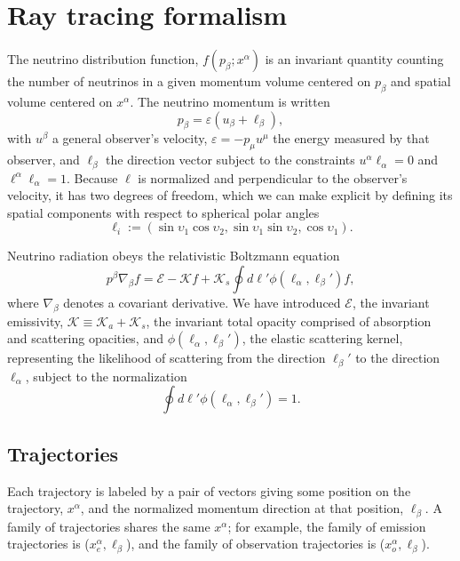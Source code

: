 \documentclass[aps,prd,twocolumn,superscriptaddress,groupedaddress]{revtex4}
\newcommand{\todo}[1]{\marginpar{\tiny{\textcolor{red}{#1}}}}
\begin{document}
\section{Ray tracing formalism}

The neutrino distribution function, $f(p_\beta; x^\alpha)$ is an invariant
quantity counting the number of neutrinos in a given momentum volume centered on
$p_\beta$ and spatial volume centered on $x^\alpha$.
The neutrino momentum is written
\begin{equation}
  \label{eqn:def_momentum}
  p_\beta = \varepsilon (u_\beta + \ell_\beta),
\end{equation}
with $u^\beta$ a general observer's velocity,
$\varepsilon=-p_\mu u^\mu$ the energy measured by that observer,
and $\ell_\beta$ the direction vector subject to the constraints
$u^\alpha \ell_\alpha = 0$ and
$\ell^\alpha \ell_\alpha=1$.
Because $\ell$ is normalized and perpendicular to the observer's velocity,
it has two degrees of freedom, which we can make explicit by defining its
spatial components with respect to spherical polar angles
\begin{equation}
  \label{eq:def_direction}
  \ell_i :=
  (\sin\upsilon_1\cos\upsilon_2,\sin\upsilon_1\sin\upsilon_2,\cos\upsilon_1).
\end{equation}

Neutrino radiation obeys the relativistic Boltzmann equation
\todo{integral isn't explicitly covariant}
\todo{correct this to differentiate in phase space}
\begin{equation}
  \label{eqn:boltzmann}
  p^\beta \nabla_\beta f = \mathscr{E} - \mathscr{K} f
  + \mathscr{K}_s \oint d\ell' \phi(\ell_\alpha,\ell_\beta') f,
\end{equation}
where $\nabla_\beta$ denotes a covariant derivative. We have introduced
$\mathscr{E}$, the invariant emissivity,
$\mathscr{K}\equiv\mathscr{K}_a+\mathscr{K}_s$, the invariant total opacity
comprised of absorption and scattering opacities, and
$\phi(\ell_\alpha,\ell_\beta')$, the elastic scattering kernel, representing the
likelihood of scattering from the direction $\ell_\beta'$ to the direction
$\ell_\alpha$, subject to the normalization
\todo{confirm this}
\begin{equation}
  \oint d\ell' \phi(\ell_\alpha,\ell_\beta') = 1.
  \nonumber
\end{equation}

\subsection{Trajectories}
\label{ssc:trajectories}
Each trajectory is labeled by a pair of vectors
giving some position on the trajectory, $x^\alpha$,
and the normalized momentum direction at that position,
$\ell_\beta$.
A family of trajectories shares the same $x^\alpha$; for example,
the family of emission trajectories is ($x^\alpha_e,\ell_\beta$),
and the family of observation trajectories is ($x^\alpha_o,\ell_\beta$).
\end{document}
